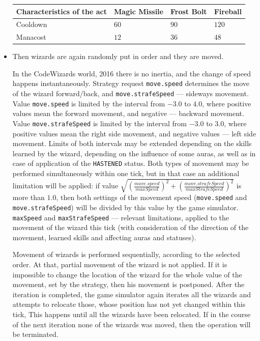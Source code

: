\begin{itemize}
            \begin{tabular}{| l | l | l | l |}
            \hline
            Characteristics of the act & Magic Missile    & Frost Bolt & Fireball \\
            \hline
            Cooldown           & $60$\footnotemark[12] & $90$                  & $120$         \\
            Manacost               & $12$                      & $36$          & $48$          \\
            \hline
            \end{tabular}
            \item Then wizards are again randomly put in order and they are moved.
 
            In the CodeWizards world, 2016 there is no inertia, and the change of speed happens instantaneously. Strategy request \texttt{move.speed} determines
            the move of the wizard forward/back, and \texttt{move.strafeSpeed} --- sideways movement. Value \texttt{move.speed} is limited
            by the interval from $-3.0$ to $4.0$, where positive values mean the forward movement, and negative --- backward movement. Value
            \texttt{move.strafeSpeed} is limited by the interval from $-3.0$ to $3.0$, where positive values mean the right side
            movement, and negative values --- left side movement. Limits of both intervals may be extended depending on the skills learned by the wizard, depending
            on the influence of some auras, as well as in case of application of the \texttt{HASTENED} status. Both types of movement may be performed
            simultaneously within one tick, but in that case an additional limitation will be applied: if value
            \texttt{$\sqrt{(\frac{move.speed}{maxSpeed})^2 + (\frac{move.strafeSpeed}{maxStrafeSpeed})^2}$} is more than $1.0$, then both settings
            of the movement speed (\texttt{move.speed} and \texttt{move.strafeSpeed}) will be divided by this value by the game simulator.
            \texttt{maxSpeed} and \texttt{maxStrafeSpeed} --- relevant limitations, applied to the movement of the wizard this tick (with
            consideration of the direction of the movement, learned skills and affecting auras and statuses).
 
            Movement of wizards is performed sequentially, according to the selected order. At that, partial movement of the wizard is not
            applied. If it is impossible to change the location of the wizard for the whole value of the movement, set by the strategy\footnotemark[13], then
            his movement is postponed. After the iteration is completed, the game simulator again iterates all the wizards and attempts
            to relocate those, whose position has not yet changed within this tick, This happens until all the wizards have been relocated.
            If in the course of the next iteration none of the wizards was moved, then the operation will be terminated.
 

\end{itemize}
